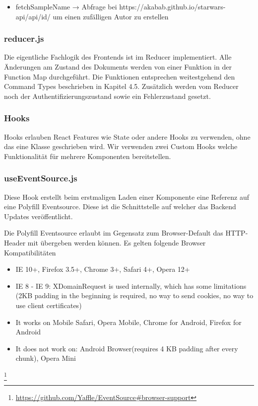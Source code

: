 \begin{itemize}
    \item fetchSampleName → Abfrage bei https://akabab.github.io/starwars-api/api/id/ um einen zufälligen Autor zu erstellen
\end{itemize}

\subsubsection*{reducer.js}
Die eigentliche Fachlogik des Frontends ist im Reducer implementiert.
Alle Änderungen am Zustand des Dokuments werden von einer Funktion in der Function Map durchgeführt.
Die Funktionen entsprechen weitestgehend den Command Types beschrieben in Kapitel 4.5.
Zusätzlich werden vom Reducer noch der Authentifizierungszustand sowie ein Fehlerzustand gesetzt.

\subsubsection{Hooks}
Hooks erlauben React Features wie State oder andere Hooks zu verwenden, ohne das eine Klasse geschrieben wird.
Wir verwenden zwei Custom Hooks welche Funktionalität für mehrere Komponenten bereitstellen.

\subsubsection*{useEventSource.js}
Diese Hook erstellt beim erstmaligen Laden einer Komponente eine Referenz auf eine Polyfill Eventsource.
Diese ist die Schnittstelle auf welcher das Backend Updates veröffentlicht.

Die Polyfill Eventsource erlaubt im Gegensatz zum Browser-Default das HTTP-Header mit übergeben werden können.
Es gelten folgende Browser Kompatibilitäten

\begin{itemize}
    \item IE 10+, Firefox 3.5+, Chrome 3+, Safari 4+, Opera 12+
    \item IE 8 - IE 9: XDomainRequest is used internally, which has some limitations (2KB padding in the beginning is required, no way to send cookies, no way to use client certificates)
    \item It works on Mobile Safari, Opera Mobile, Chrome for Android, Firefox for Android
    \item It does not work on: Android Browser(requires 4 KB padding after every chunk), Opera Mini
\end{itemize}
\footnote{\url{https://github.com/Yaffle/EventSource#browser-support}}

